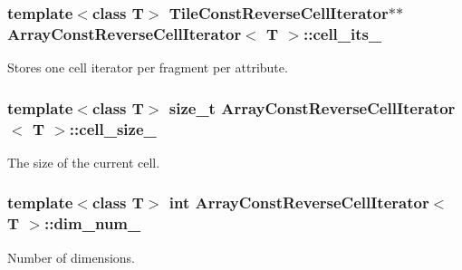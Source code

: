 \subsubsection[{cell\+\_\+its\+\_\+}]{\setlength{\rightskip}{0pt plus 5cm}template$<$class T$>$ {\bf Tile\+Const\+Reverse\+Cell\+Iterator}$\ast$$\ast$ {\bf Array\+Const\+Reverse\+Cell\+Iterator}$<$ T $>$\+::cell\+\_\+its\+\_\+\hspace{0.3cm}{\ttfamily [private]}}\label{classArrayConstReverseCellIterator_aadcf6aacd77397b27faf6405a4c4d406}
Stores one cell iterator per fragment per attribute. \hypertarget{classArrayConstReverseCellIterator_a748ade20b062b17bd18fe6a8feb41533}{}
\subsubsection[{cell\+\_\+size\+\_\+}]{\setlength{\rightskip}{0pt plus 5cm}template$<$class T$>$ size\+\_\+t {\bf Array\+Const\+Reverse\+Cell\+Iterator}$<$ T $>$\+::cell\+\_\+size\+\_\+\hspace{0.3cm}{\ttfamily [private]}}\label{classArrayConstReverseCellIterator_a748ade20b062b17bd18fe6a8feb41533}
The size of the current cell. \hypertarget{classArrayConstReverseCellIterator_aacda7582007c4940b40027f254fa2ada}{}
\subsubsection[{dim\+\_\+num\+\_\+}]{\setlength{\rightskip}{0pt plus 5cm}template$<$class T$>$ int {\bf Array\+Const\+Reverse\+Cell\+Iterator}$<$ T $>$\+::dim\+\_\+num\+\_\+\hspace{0.3cm}{\ttfamily [private]}}\label{classArrayConstReverseCellIterator_aacda7582007c4940b40027f254fa2ada}
Number of dimensions. \hypertarget{classArrayConstReverseCellIterator_a80133c14893b4c29077916474a0d619f}{}
